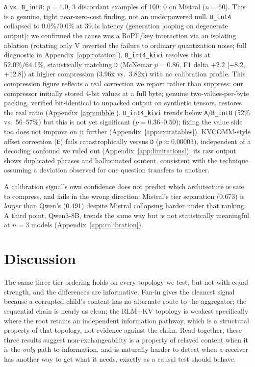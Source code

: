 \documentclass[11pt]{article}
\begin{document}
\texttt{A} vs.\ \texttt{B\_int8}: $p=1.0$, 3 discordant examples of 100;
0 on Mistral ($n=50$). This is a genuine, tight near-zero-cost finding,
not an underpowered null. \texttt{B\_int4} collapsed to 0.0\%/0.0\% at
39.4s latency (generation looping on degenerate output); we confirmed
the cause was a RoPE/key interaction via an isolating ablation (rotating
only V reverted the failure to ordinary quantization noise; full
diagnostic in Appendix~\ref{app:rotation}). \texttt{B\_int4\_kivi}
resolves this at 52.0\%/64.1\%, statistically matching \texttt{D}
(McNemar $p=0.86$, F1 delta $+2.2$ [$-8.2$, $+12.8$]) at higher
compression (3.96x vs.\ 3.82x) with no calibration profile. This
compression figure reflects a real correction we report rather than
suppress: our compressor initially stored 4-bit values at a full byte;
genuine two-values-per-byte packing, verified bit-identical to
unpacked output on synthetic tensors, restores the real ratio
(Appendix~\ref{app:nibble}). \texttt{B\_int4\_kivi} trends below
\texttt{A}/\texttt{B\_int8} (52\% vs.\ 56--57\%) but this is not yet
significant ($p=0.36$--$0.50$); fixing the value side too does not
improve on it further (Appendix~\ref{app:extratables}). KVCOMM-style
offset correction (\texttt{E}) fails catastrophically versus \texttt{D}
($p\approx0.00003$), independent of a decoding confound we ruled out
(Appendix~\ref{app:limitations}): its raw output shows duplicated
phrases and hallucinated content, consistent with the technique
assuming a deviation observed for one question transfers to another.

A calibration signal's own confidence does not predict which
architecture is safe to compress, and fails in the wrong direction:
Mistral's tier separation (0.673) is \emph{larger} than Qwen's (0.491)
despite Mistral collapsing harder under that ranking. A third point,
Qwen3-8B, trends the same way but is not statistically meaningful at
$n=3$ models (Appendix~\ref{app:calibration}).

\section{Discussion}

The same three-tier ordering holds on every topology we test, but not
with equal strength, and the differences are informative. Fan-in gives
the cleanest signal because a corrupted child's content has no
alternate route to the aggregator; the sequential chain is nearly as
clean; the RLM+KV topology is weakest specifically where the root
retains an independent information pathway, which is a structural
property of that topology, not evidence against the claim. Read
together, these three results suggest non-exchangeability is a
property of relayed content when it is the \emph{only} path to
information, and is naturally harder to detect when a receiver has
another way to get what it needs, exactly as a causal test should
behave.
\end{document}
